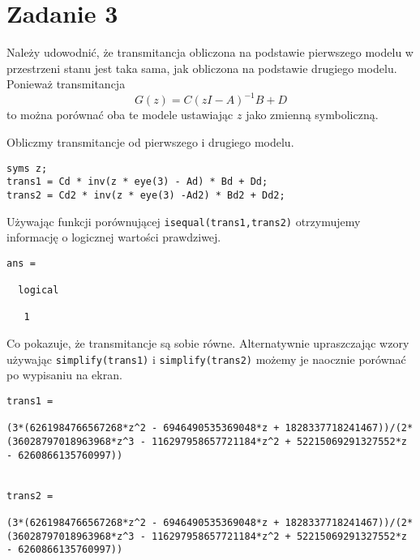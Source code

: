 \section{Zadanie 3}
Należy udowodnić, że transmitancja obliczona na podstawie pierwszego modelu w przestrzeni stanu jest taka sama, jak obliczona na podstawie drugiego modelu.
Ponieważ transmitancja
\[
 G(z)=C(zI-A)^{-1}B+D
\]
to można porównać oba te modele ustawiając $z$ jako zmienną symboliczną.

Obliczmy transmitancje od pierwszego i drugiego modelu.
\begin{verbatim}
syms z;
trans1 = Cd * inv(z * eye(3) - Ad) * Bd + Dd;
trans2 = Cd2 * inv(z * eye(3) -Ad2) * Bd2 + Dd2;
\end{verbatim}
Używając funkcji porównującej \texttt{isequal(trans1,trans2)} otrzymujemy informację o logicznej wartości prawdziwej.
\begin{verbatim}
ans =

  logical

   1
\end{verbatim}
 
Co pokazuje, że transmitancje są sobie równe. Alternatywnie upraszczając wzory używając \texttt{simplify(trans1)} i \texttt{simplify(trans2)}
możemy je naocznie porównać po wypisaniu na ekran.
\begin{verbatim}
trans1 =
 
(3*(6261984766567268*z^2 - 6946490535369048*z + 1828337718241467))/(2*(36028797018963968*z^3 - 116297958657721184*z^2 + 52215069291327552*z - 6260866135760997))
 
 
trans2 =
 
(3*(6261984766567268*z^2 - 6946490535369048*z + 1828337718241467))/(2*(36028797018963968*z^3 - 116297958657721184*z^2 + 52215069291327552*z - 6260866135760997))
\end{verbatim}

